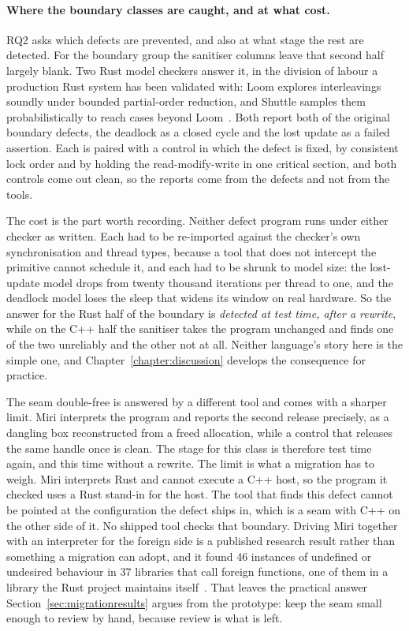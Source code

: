 \documentclass[english,oneside,a4paper,censored,csm,software-track-2020]{HYthesisML}
\begin{document}
\paragraph{Where the boundary classes are caught, and at what cost.}
RQ2 asks which defects are prevented, and also at what stage the rest are detected. For
the boundary group the sanitiser columns leave that second half largely blank. Two Rust model
checkers answer it, in the division of labour a production Rust system has been validated
with: Loom explores interleavings soundly under bounded partial-order reduction, and Shuttle
samples them probabilistically to reach cases beyond Loom~\cite{bornholt2021shardstore}. Both
report both of the original boundary defects, the deadlock as a closed cycle and the lost update
as a failed assertion. Each is paired with a control in which the defect is fixed, by consistent
lock order and by holding the read-modify-write in one critical section, and both controls come
out clean, so the reports come from the defects and not from the tools.

The cost is the part worth recording. Neither defect program runs under either checker as
written. Each had to be re-imported against the checker's own synchronisation and thread types,
because a tool that does not intercept the primitive cannot schedule it, and each had to be
shrunk to model size: the lost-update model drops from twenty thousand iterations per thread to
one, and the deadlock model loses the sleep that widens its window on real hardware. So the
answer for the Rust half of the boundary is \emph{detected at test time, after a rewrite}, while
on the C++ half the sanitiser takes the program unchanged and finds one of the two unreliably and
the other not at all. Neither language's story here is the simple one, and
Chapter~\ref{chapter:discussion} develops the consequence for practice.

The seam double-free is answered by a different tool and comes with a sharper limit. Miri
interprets the program and reports the second release precisely, as a dangling box
reconstructed from a freed allocation, while a control that
releases the same handle once is clean. The stage for this class is therefore test
time again, and this time without a rewrite. The limit is what a migration has to weigh. Miri
interprets Rust and cannot execute a C++ host, so the program it checked uses a Rust stand-in
for the host. The tool that finds this defect cannot be pointed at the configuration the defect
ships in, which is a seam with C++ on the other side of it. No shipped tool checks that
boundary. Driving Miri together with an interpreter for the foreign side is a published research
result rather than something a migration can adopt, and it found 46 instances of undefined or
undesired behaviour in 37 libraries that call foreign functions, one of them in a library the
Rust project maintains itself~\cite{mccormack2025ffi}. That leaves the practical answer
Section~\ref{sec:migrationresults} argues from the prototype: keep the seam small enough to
review by hand, because review is what is left.
\end{document}
